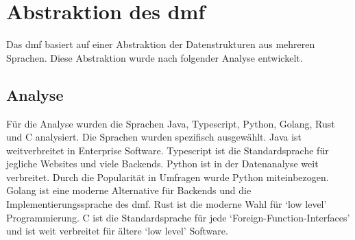 \documentclass[./einleitung.tex]{subfiles}
\begin{document}
    \section{Abstraktion des \acrshort{dmf}}
    Das \acrshort{dmf} basiert auf einer Abstraktion der Datenstrukturen aus mehreren Sprachen.
    Diese Abstraktion wurde nach folgender Analyse entwickelt.

    \subsection{Analyse}
    Für die Analyse wurden die Sprachen Java, Typescript, Python, Golang, Rust und C analysiert.
    Die Sprachen wurden spezifisch ausgewählt.
    Java ist weitverbreitet in Enterprise Software.
    Typescript ist die Standardsprache für jegliche Websites und viele Backends.
    Python ist in der Datenanalyse weit verbreitet.
    Durch die Popularität in Umfragen wurde Python miteinbezogen.
    Golang ist eine moderne Alternative für Backends und die Implementierungssprache des \acrshort{dmf}.
    Rust ist die moderne Wahl für `low level' Programmierung.
    C ist die Standardsprache für jede `Foreign-Function-Interfaces' und ist weit verbreitet für ältere `low level' Software.
\end{document}
